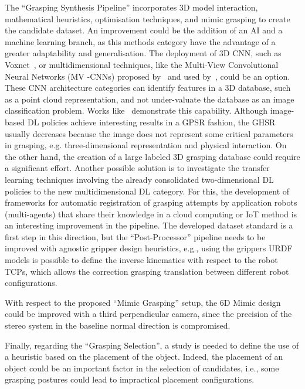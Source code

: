 The ``Grasping Synthesis Pipeline'' incorporates 3D model interaction, mathematical heuristics, optimisation techniques, and mimic grasping to create the candidate dataset. An improvement could be the addition of an AI and a machine learning branch, as this methods category have the advantage of a greater adaptability and generalisation. The deployment of 3D \ac{CNN}, such as Voxnet~\cite{maturana2015voxnet}, or multidimensional techniques, like the Multi-View Convolutional Neural Networks (MV -CNNs) proposed by~\cite{su2015multi} and used by~\cite{Mahler2016}, could be an option. These CNN architecture categories can identify features in a 3D database, such as a point cloud representation, and not under-valuate the database as an image classification problem. Works like~\cite{choi2018learning} demonstrate this capability. Although image-based \ac{DL} policies achieve interesting results in a \ac{GPSR} fashion, the \ac{GHSR} usually decreases because the image does not represent some critical parameters in grasping, e.g. three-dimensional representation and physical interaction. On the other hand, the creation of a large labeled 3D grasping database could require a significant effort. Another possible solution is to investigate the transfer learning techniques involving the already consolidated two-dimensional \ac{DL} policies to the new multidimensional \ac{DL} category. For this, the development of frameworks for automatic registration of grasping attempts by application robots (multi-agents) that share their knowledge in a cloud computing or IoT method is an interesting improvement in the pipeline. The developed dataset standard is a first step in this direction, but the ``Post-Processor'' pipeline needs to be improved with agnostic gripper design heuristics, e.g., using the grippers URDF models is possible to define the inverse kinematics with respect to the robot \acp{TCP}, which allows the correction grasping translation between different robot configurations. 

With respect to the proposed ``Mimic Grasping'' setup, the 6D Mimic design could be improved with a third perpendicular camera, since the precision of the stereo system in the baseline normal direction is compromised.

Finally, regarding the ``Grasping Selection'', a study is needed to define the use of a heuristic based on the placement of the object. Indeed, the placement of an object could be an important factor in the selection of candidates, i.e., some grasping postures could lead to impractical placement configurations.



  








